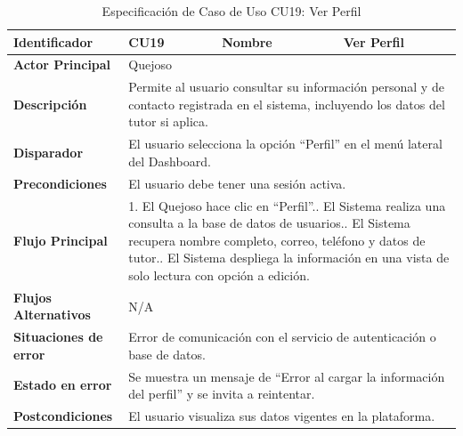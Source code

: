 \vspace{0.8cm}

\begingroup
\setlength{\parskip}{0pt}
\begin{longtable}{|p{3.5cm}|p{2cm}|p{2.5cm}|p{7cm}|}
\caption{Especificación de Caso de Uso CU19: Ver Perfil}
\label{tab:cu19_ver_perfil} \\
\hline
\textbf{Identificador} & CU19 & \textbf{Nombre} & Ver Perfil \\ \hline
\textbf{Actor Principal} & \multicolumn{3}{p{11.5cm}|}{Quejoso} \\ \hline
\textbf{Descripción} & \multicolumn{3}{p{11.5cm}|}{Permite al usuario consultar su información personal y de contacto registrada en el sistema, incluyendo los datos del tutor si aplica.} \\ \hline
\textbf{Disparador} & \multicolumn{3}{p{11.5cm}|}{El usuario selecciona la opción ``Perfil'' en el menú lateral del Dashboard.} \\ \hline
\textbf{Precondiciones} & \multicolumn{3}{p{11.5cm}|}{El usuario debe tener una sesión activa.} \\ \hline
\textbf{Flujo Principal} & \multicolumn{3}{p{11.5cm}|}{1. El Quejoso hace clic en ``Perfil''.\newline 2. El Sistema realiza una consulta a la base de datos de usuarios.\newline 3. El Sistema recupera nombre completo, correo, teléfono y datos de tutor.\newline 4. El Sistema despliega la información en una vista de solo lectura con opción a edición.} \\ \hline
\textbf{Flujos Alternativos} & \multicolumn{3}{p{11.5cm}|}{N/A} \\ \hline
\textbf{Situaciones de error} & \multicolumn{3}{p{11.5cm}|}{Error de comunicación con el servicio de autenticación o base de datos.} \\ \hline
\textbf{Estado en error} & \multicolumn{3}{p{11.5cm}|}{Se muestra un mensaje de ``Error al cargar la información del perfil'' y se invita a reintentar.} \\ \hline
\textbf{Postcondiciones} & \multicolumn{3}{p{11.5cm}|}{El usuario visualiza sus datos vigentes en la plataforma.} \\ \hline
\end{longtable}
\endgroup

\vspace{0.8cm}

